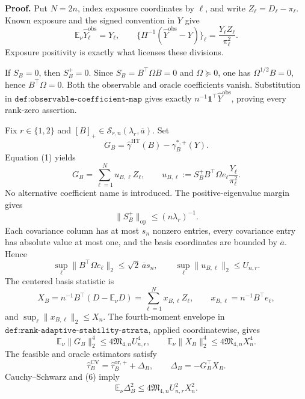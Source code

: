 \textbf{Proof.}
Put \(N=2n\), index exposure coordinates by \(\ell\), and write \(Z_\ell=D_\ell-\pi_\ell\).  Known exposure and the signed convention in \(Y\) give
\[
\mathbb E_\nu\widehat Y_\ell^{\mathrm{obs}}=Y_\ell,
\qquad
\{\Pi^{-1}(\widehat Y^{\mathrm{obs}}-Y)\}_\ell
=\frac{Y_\ell Z_\ell}{\pi_\ell^2}.
\tag{1}
\]
Exposure positivity is exactly what licenses these divisions.

If \(S_B=0\), then \(S_B^+=0\).  Since \(S_B=B^\top\Omega B=0\) and \(\Omega\succeq0\), one has \(\Omega^{1/2}B=0\), hence \(B^\top\Omega=0\).  Both the observable and oracle coefficients vanish.  Substitution in \(\texttt{def:observable-coefficient-map}\) gives exactly \(n^{-1}\mathbf1^\top\widehat Y^{\mathrm{obs}}\), proving every rank-zero assertion.

Fix \(r\in\{1,2\}\) and \([B]_+\in\mathcal S_{r,n}(\lambda_r,\overline a)\).  Set
\[
G_B=\widehat\gamma^{\mathrm{HT}}(B)-\gamma_B^{*,+}(Y).
\]
Equation (1) yields
\[
G_B=\sum_{\ell=1}^{N}u_{B,\ell}Z_\ell,
\qquad
u_{B,\ell}:=S_B^+B^\top\Omega e_\ell\frac{Y_\ell}{\pi_\ell^2}.
\tag{2}
\]
No alternative coefficient name is introduced.  The positive-eigenvalue margin gives
\[
\lVert S_B^+\rVert_{\mathrm{op}}\le(n\lambda_r)^{-1}.
\tag{3}
\]
Each covariance column has at most \(s_n\) nonzero entries, every covariance entry has absolute value at most one, and the basis coordinates are bounded by \(\overline a\).  Hence
\[
\sup_\ell\lVert B^\top\Omega e_\ell\rVert_2
\le\sqrt2\,\overline a s_n,
\qquad
\sup_\ell\lVert u_{B,\ell}\rVert_2\le U_{n,r}.
\tag{4}
\]
The centered basis statistic is
\[
X_B=n^{-1}B^\top(D-\mathbb E_\nu D)
=\sum_{\ell=1}^{N}x_{B,\ell}Z_\ell,
\qquad x_{B,\ell}=n^{-1}B^\top e_\ell,
\tag{5}
\]
and \(\sup_\ell\lVert x_{B,\ell}\rVert_2\le X_n\).  The fourth-moment envelope in \(\texttt{def:rank-adaptive-stability-strata}\), applied coordinatewise, gives
\[
\mathbb E_\nu\lVert G_B\rVert_2^4
\le4\mathfrak M_{4,n}U_{n,r}^4,
\qquad
\mathbb E_\nu\lVert X_B\rVert_2^4
\le4\mathfrak M_{4,n}X_n^4.
\tag{6}
\]
The feasible and oracle estimators satisfy
\[
\widehat\tau_B^{\mathrm{CV}}
=\widehat\tau_B^{\mathrm{or},+}+\Delta_B,
\qquad \Delta_B=-G_B^\top X_B.
\tag{7}
\]
Cauchy--Schwarz and (6) imply
\[
\mathbb E_\nu\Delta_B^2
\le4\mathfrak M_{4,n}U_{n,r}^2X_n^2.
\tag{8}
\]

